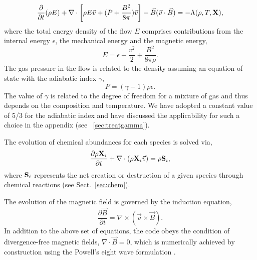 \documentclass[useAMS,usenatbib]{mn2e}
\begin{document}
\begin{equation}\label{encons1}
\frac{\partial}{\partial t}(\rho E)
+ \nabla \cdot\left[ \rho E \vec{v} + (P + \frac{B^2}{8\pi})\vec{v}\right]  
- \vec{B}(\vec{v}\cdot\vec{B}) = -\Lambda(\rho,T,{\bf{X}}),
\end{equation}
%
%
where the total energy density of the flow $E$ comprises contributions from 
the internal energy $\epsilon$, the mechanical energy and the magnetic energy,
%
\begin{equation}\label{encons2}
 E = \epsilon + \frac{v^2}{2} + \frac{B^2}{8 \pi \rho}.
\end{equation}
The gas pressure in the flow is related to the density assuming an equation 
of state with the adiabatic index $\gamma$,
%
\begin{equation}\label{EOS}
P = (\gamma - 1) \rho \epsilon.
\end{equation}
The value of $\gamma$ is related to the degree of freedom for a
mixture of gas and thus depends on the composition and temperature.
We have adopted a constant value of 5/3 for the adiabatic index and
have discussed the applicability for such a choice in the appendix 
(see ~\ref{sec:treatgamma}).

The evolution of chemical abundances for each species is solved via,
%
\begin{equation}\label{chemevol}
\frac{\partial \rho{\bf{X}}_{i}}{\partial t} + \nabla \cdot (\rho
{\bf{X}}_{i} \vec{v})  = \rho {\bf{S}}_{i},
\end{equation}
where ${\bf{S}}_{i}$ represents the net creation or destruction of a
given species through chemical reactions (see Sect.~\ref{sec:chem}).

The evolution of the magnetic field is governed by the induction equation,
%
\begin{equation}\label{induction}
\frac{\partial \vec{B}}{\partial t} = \nabla \times \left(\vec{v}\times \vec{B}\right).
\end{equation}
%
In addition to the above set of equations, the code obeys the condition of divergence-free 
magnetic fields, $\nabla \cdot \vec{B} = 0$, which is numerically achieved by construction 
using the Powell's eight wave formulation \citep{Powell:1999p14822}.
\end{document}
